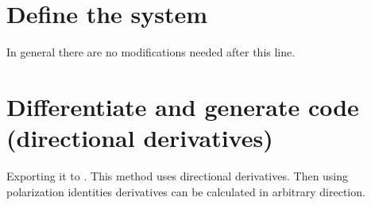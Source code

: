 \documentclass[letterpaper,10pt,english]{jupyterBook}
\begin{document}
\section{Define the system}
\label{\detokenize{IFOCGenSym:define-the-system}}
\begin{sphinxVerbatim}[commandchars=\\\{\}]
\PYG{p}{[}\PYG{p}{]}
\end{sphinxVerbatim}

\sphinxAtStartPar
In general there are no modifications needed after this line.


\section{Differentiate and generate code (directional derivatives)}
\label{\detokenize{IFOCGenSym:differentiate-and-generate-code-directional-derivatives}}
\sphinxAtStartPar
Exporting it to . This method uses directional derivatives.
Then using polarization identities derivatives can be calculated in arbitrary
direction.
\end{document}
